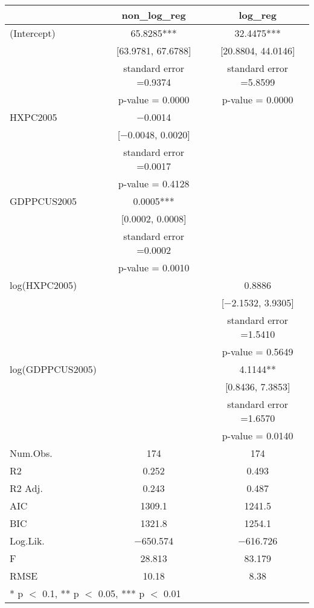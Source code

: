 \documentclass[
]{article}
\begin{document}
\begin{table}
\centering
\begin{tabular}[t]{lcc}
\toprule
  & non\_log\_reg & log\_reg\\
\midrule
(Intercept) & \num{65.8285}*** & \num{32.4475}***\\
 & {}[\num{63.9781}, \num{67.6788}] & {}[\num{20.8804}, \num{44.0146}]\\
 & standard error 
=\num{0.9374} & standard error 
=\num{5.8599}\\
 & p-value = \num{0.0000} & p-value = \num{0.0000}\\
HXPC2005 & \num{-0.0014} & \\
 & {}[\num{-0.0048}, \num{0.0020}] & \\
 & standard error 
=\num{0.0017} & \\
 & p-value = \num{0.4128} & \\
GDPPCUS2005 & \num{0.0005}*** & \\
 & {}[\num{0.0002}, \num{0.0008}] & \\
 & standard error 
=\num{0.0002} & \\
 & p-value = \num{0.0010} & \\
log(HXPC2005) &  & \num{0.8886}\\
 &  & {}[\num{-2.1532}, \num{3.9305}]\\
 &  & standard error 
=\num{1.5410}\\
 &  & p-value = \num{0.5649}\\
log(GDPPCUS2005) &  & \num{4.1144}**\\
 &  & {}[\num{0.8436}, \num{7.3853}]\\
 &  & standard error 
=\num{1.6570}\\
 &  & p-value = \num{0.0140}\\
\midrule
Num.Obs. & \num{174} & \num{174}\\
R2 & \num{0.252} & \num{0.493}\\
R2 Adj. & \num{0.243} & \num{0.487}\\
AIC & \num{1309.1} & \num{1241.5}\\
BIC & \num{1321.8} & \num{1254.1}\\
Log.Lik. & \num{-650.574} & \num{-616.726}\\
F & \num{28.813} & \num{83.179}\\
RMSE & \num{10.18} & \num{8.38}\\
\bottomrule
\multicolumn{3}{l}{\rule{0pt}{1em}* p $<$ 0.1, ** p $<$ 0.05, *** p $<$ 0.01}\\
\end{tabular}
\end{table}
\end{document}
